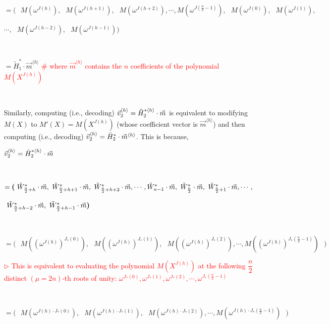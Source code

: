 $ $

$= \bm{(} \text{ } M(\omega^{J(h)}), \text{ } M(\omega^{J(h+1)}), \text{ } M(\omega^{J(h+2)}), \cdots, M(\omega^{J(\frac{n}{2}-1)}), \text{ } M(\omega^{J(0)}), \text{ }M(\omega^{J(1)}),$ 
                                    
$\cdots, \text{ } M(\omega^{J(h-2)}), \text{ } M(\omega^{J(h-1)})  \bm{)}$ 

$ $

$= \tilde{H}_1^{*}\cdot \vec{m}^{\langle h \rangle}$ \textcolor{red}{ \text{ } \# where $\vec{m}^{\langle h \rangle}$ contains the $n$ coefficients of the polynomial $M(X^{J(h)})$ }


$ $

Similarly, computing (i.e., decoding) $\vec{v}_2^{\langle h \rangle} = \tilde{H}_2^{*\langle h \rangle}\cdot \vec{m}$ is equivalent to modifying $M(X)$ to $M'(X) = M(X^{J(h)})$ (whose coefficient vector is $\vec{m}^{\langle h \rangle}$) and then computing (i.e., decoding) $\vec{v}_2^{\langle h \rangle} = \tilde{H}_2^{*}\cdot \vec{m}^{\langle h \rangle}$. This is because,

$\vec{v}_2^{\langle h \rangle} =\tilde{H}_2^{*\langle h \rangle}\cdot \vec{m}$

$ $


$ = \bm{(} \text{ } \tilde{W}^*_{\frac{n}{2} +h}\cdot\vec{m}, \text{ } \tilde{W}^*_{\frac{n}{2} + h+1}\cdot\vec{m}, \text{ } \tilde{W}^*_{\frac{n}{2} +h+2}\cdot\vec{m}, \cdots, \tilde{W}^*_{n -1}\cdot\vec{m}, \text{ } \tilde{W}^*_{\frac{n}{2}}\cdot\vec{m}, \text{ }\tilde{W}^*_{\frac{n}{2} + 1}\cdot\vec{m}, \cdots,$

\text{ }\text{ }\text{ }\text{ }$ \text{ } \tilde{W}^*_{\frac{n}{2} + h-2}\cdot\vec{m}, \text{ } \tilde{W}^*_{\frac{n}{2} + h-1}\cdot\vec{m}  \bm{)}$

$ $

$= \bm{(} \text{ } M((\omega^{J(h)})^{J_*(0)}), \text{ } M((\omega^{J(h)})^{J_*(1)}), \text{ } M((\omega^{J(h)})^{J_*(2)}), \cdots, M((\omega^{J(h)})^{J_*(\frac{n}{2}-1)}) \text{ } \bm{)}$


\textcolor{red}{ $\rhd$ This is equivalent to evaluating the polynomial $M(X^{J(h)})$ at the following $\dfrac{n}{2}$ distinct $(\mu=2n)$-th roots of unity: $\omega^{J_*(0)}, \omega^{J_*(1)},  \omega^{J_*(2)}, \cdots, \omega^{J_*(\frac{n}{2} - 1)}$}

$ $

$= \bm{(} \text{ } M(\omega^{J(h)\cdot J_*(0)}), \text{ } M(\omega^{J(h)\cdot J_*(1)}), \text{ } M(\omega^{J(h)\cdot J_*(2)}), \cdots, M(\omega^{J(h)\cdot J_*(\frac{n}{2}-1)}) \text{ } \bm{)}$

